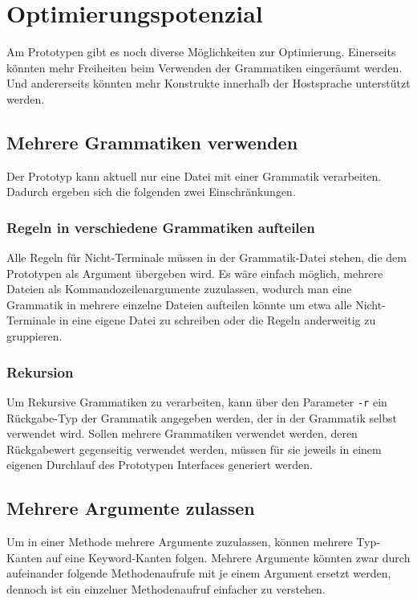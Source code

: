 \documentclass[../InterneDSLs.tex]{subfiles}
\begin{document}
\section{Optimierungspotenzial}\label{SEC:Improvements}
Am Prototypen gibt es noch diverse Möglichkeiten zur Optimierung. Einerseits könnten mehr Freiheiten beim Verwenden der Grammatiken eingeräumt werden. Und andererseits könnten mehr Konstrukte innerhalb der Hostsprache unterstützt werden.

\subsection{Mehrere Grammatiken verwenden}
Der Prototyp kann aktuell nur eine Datei mit einer Grammatik verarbeiten. Dadurch ergeben sich die folgenden zwei Einschränkungen.

\subsubsection{Regeln in verschiedene Grammatiken aufteilen}
Alle Regeln für Nicht-Terminale müssen in der Grammatik-Datei stehen, die dem Prototypen als Argument übergeben wird. Es wäre einfach möglich, mehrere Dateien als Kommandozeilenargumente zuzulassen, wodurch man eine Grammatik in mehrere einzelne Dateien aufteilen könnte um etwa alle Nicht-Terminale in eine eigene Datei zu schreiben oder die Regeln anderweitig zu gruppieren.

\subsubsection{Rekursion}
Um Rekursive Grammatiken zu verarbeiten, kann über den Parameter \verb|-r| ein Rückgabe-Typ der Grammatik angegeben werden, der in der Grammatik selbst verwendet wird. Sollen mehrere Grammatiken verwendet werden, deren Rückgabewert gegenseitig verwendet werden, müssen für sie jeweils in einem eigenen Durchlauf des Prototypen Interfaces generiert werden.

\subsection{Mehrere Argumente zulassen}
Um in einer Methode mehrere Argumente zuzulassen, können mehrere Typ-Kanten auf eine Keyword-Kanten folgen. Mehrere Argumente könnten zwar durch aufeinander folgende Methodenaufrufe mit je einem Argument ersetzt werden, dennoch ist ein einzelner Methodenaufruf einfacher zu verstehen.
\end{document}
